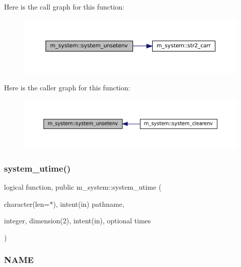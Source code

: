 Here is the call graph for this function\+:\nopagebreak
\begin{figure}[H]
\begin{center}
\leavevmode
\includegraphics[width=350pt]{namespacem__system_a61b67b46b35490ec308773b65c3376a3_cgraph}
\end{center}
\end{figure}
Here is the caller graph for this function\+:\nopagebreak
\begin{figure}[H]
\begin{center}
\leavevmode
\includegraphics[width=350pt]{namespacem__system_a61b67b46b35490ec308773b65c3376a3_icgraph}
\end{center}
\end{figure}
\mbox{\label{namespacem__system_a83a121ba0b525210b5217565569ef350}} 
\subsubsection{\texorpdfstring{system\+\_\+utime()}{system\_utime()}}
{\footnotesize\ttfamily logical function, public m\+\_\+system\+::system\+\_\+utime (\begin{DoxyParamCaption}\item[{character(len=$\ast$), intent(in)}]{pathname,  }\item[{integer, dimension(2), intent(in), optional}]{times }\end{DoxyParamCaption})}



\subsubsection*{N\+A\+ME}

